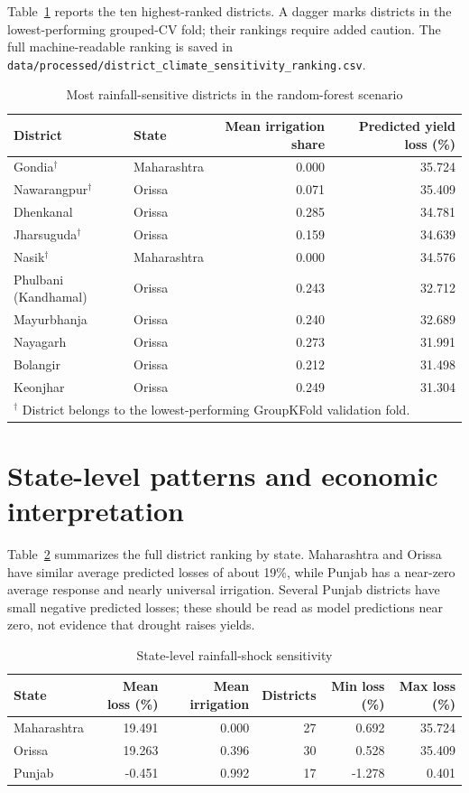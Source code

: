 \documentclass[11pt]{article}
\begin{document}
Table~\ref{tab:districts} reports the ten highest-ranked districts. A dagger marks districts in the lowest-performing grouped-CV fold; their rankings require added caution. The full machine-readable ranking is saved in \texttt{data/processed/district\_climate\_sensitivity\_ranking.csv}.

\begin{table}[H]
\centering
\caption{Most rainfall-sensitive districts in the random-forest scenario}
\label{tab:districts}
\begin{tabular}{llrr}
\toprule
District & State & Mean irrigation share & Predicted yield loss (\%) \\
\midrule
Gondia$^\dagger$ & Maharashtra & 0.000 & 35.724 \\
Nawarangpur$^\dagger$ & Orissa & 0.071 & 35.409 \\
Dhenkanal & Orissa & 0.285 & 34.781 \\
Jharsuguda$^\dagger$ & Orissa & 0.159 & 34.639 \\
Nasik$^\dagger$ & Maharashtra & 0.000 & 34.576 \\
Phulbani (Kandhamal) & Orissa & 0.243 & 32.712 \\
Mayurbhanja & Orissa & 0.240 & 32.689 \\
Nayagarh & Orissa & 0.273 & 31.991 \\
Bolangir & Orissa & 0.212 & 31.498 \\
Keonjhar & Orissa & 0.249 & 31.304 \\
\bottomrule
\multicolumn{4}{l}{\footnotesize $^\dagger$ District belongs to the lowest-performing GroupKFold validation fold.}
\end{tabular}
\end{table}

\section{State-level patterns and economic interpretation}

Table~\ref{tab:state} summarizes the full district ranking by state. Maharashtra and Orissa have similar average predicted losses of about 19\%, while Punjab has a near-zero average response and nearly universal irrigation. Several Punjab districts have small negative predicted losses; these should be read as model predictions near zero, not evidence that drought raises yields.

\begin{table}[H]
\centering
\caption{State-level rainfall-shock sensitivity}
\label{tab:state}
\begin{tabular}{lrrrrr}
\toprule
State & Mean loss (\%) & Mean irrigation & Districts & Min loss (\%) & Max loss (\%) \\
\midrule
Maharashtra & 19.491 & 0.000 & 27 & 0.692 & 35.724 \\
Orissa & 19.263 & 0.396 & 30 & 0.528 & 35.409 \\
Punjab & -0.451 & 0.992 & 17 & -1.278 & 0.401 \\
\bottomrule
\end{tabular}
\end{table}
\end{document}
